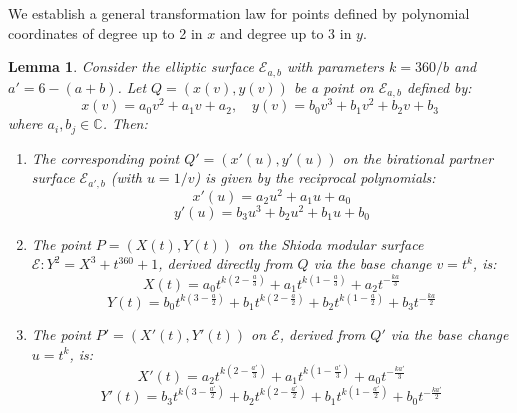 \documentclass[11pt]{amsart}
\newcommand{\Ee}{{\mathcal E}}
\newtheorem{lema}[thm]{Lemma}
\numberwithin{equation}{section}
\numberwithin{table}{section}
\newcommand\<{\langle}
\begin{document}
We establish a general transformation law for points defined by polynomial coordinates of degree up to 2 in $x$ and degree up to 3 in $y$.

\begin{lema}
	\label{lem:general_transform}
	Consider the elliptic surface $\Ee_{a,b}$ with parameters $k = 360/b$ and $a' = 6-(a+b)$. Let $Q = (x(v), y(v))$ be a point on $\Ee_{a,b}$ defined by:
	\[ x(v) = a_0 v^2 + a_1 v + a_2, \quad y(v) = b_0 v^3 + b_1 v^2 + b_2 v + b_3 \]
	where $a_i, b_j \in \mathbb{C}$. Then:
	
	\begin{enumerate}
		\item [(i)] The corresponding point $Q'=(x'(u), y'(u))$ on the birational partner surface $\Ee_{a', b}$ (with $u=1/v$) is given by the reciprocal polynomials:
		\[ x'(u) = a_2 u^2 + a_1 u + a_0 \]
		\[ y'(u) = b_3 u^3 + b_2 u^2 + b_1 u + b_0 \]
		
		\item  [(ii)] The point $P=(X(t), Y(t))$ on the Shioda modular surface $\Ee: Y^2 = X^3 + t^{360} + 1$, derived directly from $Q$ via the base change $v=t^k$, is:
		\[ X(t) = a_0 t^{k(2 - \frac{a}{3})} + a_1 t^{k(1 - \frac{a}{3})} + a_2 t^{-\frac{ka}{3}} \]
		\[ Y(t) = b_0 t^{k(3 - \frac{a}{2})} + b_1 t^{k(2 - \frac{a}{2})} + b_2 t^{k(1 - \frac{a}{2})} + b_3 t^{-\frac{ka}{2}} \]
		
		\item  [(iii)] The point $P'=(X'(t), Y'(t))$ on $\Ee$, derived from $Q'$ via the base change $u=t^k$, is:
		\[ X'(t) = a_2 t^{k(2 - \frac{a'}{3})} + a_1 t^{k(1 - \frac{a'}{3})} + a_0 t^{-\frac{ka'}{3}} \]
		\[ Y'(t) = b_3 t^{k(3 - \frac{a'}{2})} + b_2 t^{k(2 - \frac{a'}{2})} + b_1 t^{k(1 - \frac{a'}{2})} + b_0 t^{-\frac{ka'}{2}} \]
	\end{enumerate}
\end{lema}
\end{document}
